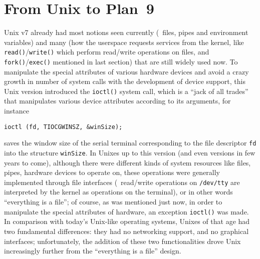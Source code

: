 \section{From Unix to Plan~9}\label{sec:plan9}

Unix v7 already had most notions seen currently
(\eg~files, pipes and environment variables) and many  (how the userspace requests services from the kernel, like
\verb|read()|/\verb|write()| which perform read/write operations on files,
and \verb|fork()|/\verb|exec()| mentioned in last section) that are still
widely used now.  To manipulate the special attributes of various hardware
devices and avoid a crazy growth in number of system calls with the development
of device support, this Unix version introduced the \verb|ioctl()| system call,
which is a ``jack of all trades'' that manipulates various device attributes
according to its arguments, for instance
\begin{wquoting}
\begin{Verbatim}
ioctl (fd, TIOCGWINSZ, &winSize);
\end{Verbatim}
\end{wquoting}
saves the window size of the serial terminal corresponding to the file
descriptor \verb|fd| into the structure \verb|winSize|.  In Unixes up to this
version (and even versions in few years to come), although there were different
kinds of system resources like files, pipes, hardware devices \etc{} to operate
on, these operations were generally implemented through file interfaces
(\eg~read/write operations on \verb|/dev/tty| are interpreted by the kernel
as operations on the terminal), or in other words ``everything is a file''; of
course, as was mentioned just now, in order to manipulate the special attributes
of hardware, an exception \verb|ioctl()| was made.  In comparison with today's
Unix-like operating systems, Unixes of that age had two fundamental differences:
they had no networking support, and no graphical interfaces; unfortunately,
the addition of these two functionalities drove Unix increasingly
further from the ``everything is a file'' design.

